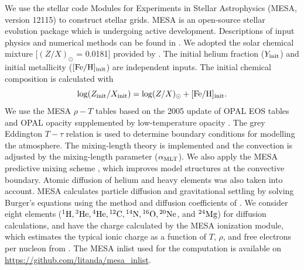 We use the stellar code Modules for Experiments in Stellar Astrophysics
(\textsc{MESA}, version 12115) to construct stellar grids. 
\textsc{MESA} is an open-source stellar evolution package which is undergoing active development. 
Descriptions of input physics and numerical methods
can be found in \citet{2011ApJS..192....3P,2013ApJS..208....4P, 2015ApJS..220...15P}.
We adopted the solar chemical mixture [$(Z/X)_{\odot}$ = 0.0181]
provided by \citet{2009ARA&A..47..481A}. 
The initial helium fraction ($Y_{\rm init}$) and initial metallicity ($\rm{[Fe/H]_{init}}$) are independent inputs. 
The initial chemical composition is calculated with 
\begin{equation}
\log (Z_{\rm{init}}/X_{\rm{init}}) = \log (Z/X)_{\odot} + \rm{[Fe/H]_{init}}.  \\
\end{equation}
We use the \textsc{MESA} $\rho-T$ tables based on the 2005
update of OPAL EOS tables \citep{2002ApJ...576.1064R} and OPAL opacity
supplemented by low-temperature opacity \citep{2005ApJ...623..585F}. 
The grey Eddington $T-\tau$ relation is used to determine boundary conditions for modelling the atmosphere.
The mixing-length theory is implemented and the convection is adjusted by the mixing-length parameter ($\alpha_{\rm MLT}$).
We also apply the \textsc{MESA} predictive mixing scheme \citep{2018ApJS..234...34P,2019ApJS..243...10P}, which improves model structures at the convective boundary.  
Atomic diffusion of helium and heavy elements was also taken into account. MESA calculates particle diffusion and gravitational settling by solving Burger's equations using the method and diffusion coefficients of \citet{Thoul94}. 
We consider eight elements (${}^1{\rm H}, {}^3{\rm He}, {}^4{\rm He}, {}^{12}{\rm C}, {}^{14}{\rm N}, {}^{16}{\rm O}, {}^{20}{\rm Ne}$, and ${}^{24}{\rm Mg}$) for diffusion calculations, and have the charge calculated by the MESA ionization module, which estimates the typical ionic charge as a function of $T$, $\rho$, and free electrons per nucleon from \citet{Paquette1986}.
The \textsc{MESA} inlist used for the computation is available on \url{https://github.com/litanda/mesa_inlist}.  


